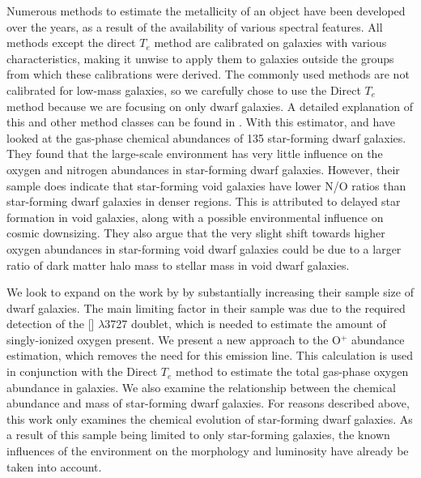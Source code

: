 Numerous methods to estimate the metallicity of an object have been developed 
over the years, as a result of the availability of various spectral features.  
All methods except the direct $T_e$ method are calibrated on galaxies with 
various characteristics, making it unwise to apply them to galaxies outside the 
groups from which these calibrations were derived.  The commonly used methods 
are not calibrated for low-mass galaxies, so we carefully chose to use the 
Direct $T_e$ method because we are focusing on only dwarf galaxies.  A detailed 
explanation of this and other method classes can be found in \cite{Douglass17a}.  
With this estimator, \cite{Douglass17a} and \cite{Douglass17b} have looked at 
the gas-phase chemical abundances of 135 star-forming dwarf galaxies.  They 
found that the large-scale environment has very little influence on the oxygen 
and nitrogen abundances in star-forming dwarf galaxies.  However, their sample 
does indicate that star-forming void galaxies have lower N/O ratios than 
star-forming dwarf galaxies in denser regions.  This is attributed to delayed 
star formation in void galaxies, along with a possible environmental influence 
on cosmic downsizing.  They also argue that the very slight shift towards higher 
oxygen abundances in star-forming void dwarf galaxies could be due to a larger 
ratio of dark matter halo mass to stellar mass in void dwarf galaxies.

We look to expand on the work by \cite{Douglass17a,Douglass17b} by substantially 
increasing their sample size of dwarf galaxies.  The main limiting factor in 
their sample was due to the required detection of the [] $\lambda$3727 
doublet, which is needed to estimate the amount of singly-ionized oxygen 
present.  We present a new approach to the O$^+$ abundance estimation, which 
removes the need for this emission line.  This calculation is used in 
conjunction with the Direct $T_e$ method to estimate the total gas-phase oxygen 
abundance in galaxies.  We also examine the relationship between the chemical 
abundance and  mass of star-forming dwarf galaxies.  For reasons 
described above, this work only examines the chemical evolution of star-forming 
dwarf galaxies.  As a result of this sample being limited to only star-forming 
galaxies, the known influences of the environment on the morphology and 
luminosity have already be taken into account.


